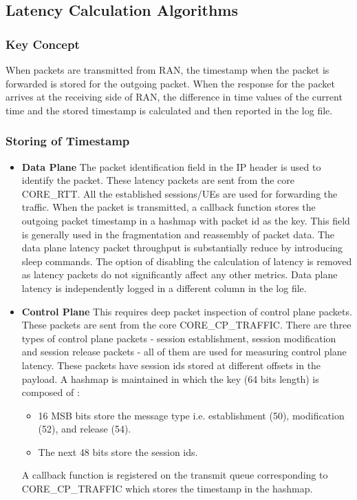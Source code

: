 \documentclass{article}
\begin{document}
\subsection{Latency Calculation Algorithms}
\subsubsection{Key Concept}
When packets are transmitted from RAN, the timestamp when the packet is forwarded is stored for the outgoing packet. When the response for the packet arrives at the receiving side of RAN, the difference in time values of the current time and the stored timestamp  is calculated and then reported in the log file.
\subsubsection{Storing of Timestamp}
\begin{itemize}
    \item \textbf{Data Plane} The packet identification field in the IP header is used to identify the packet. These latency packets
    are sent from the core CORE\_RTT. All the established sessions/UEs are used for forwarding the traffic. When the packet is
    transmitted, a callback  function stores the outgoing packet timestamp in a hashmap with packet id as the key. This field is
    generally used in the fragmentation and reassembly of packet data. The data plane latency packet throughput is substantially reduce by introducing sleep commands. The option of disabling the calculation of latency is removed as latency packets do   not significantly affect any other metrics. Data plane latency is independently logged in a different column in the log file.
    \item \textbf{Control Plane}
    This requires deep packet inspection of control plane packets. These packets are sent from the core CORE\_CP\_TRAFFIC.
    There are three types of control plane packets - session establishment, session modification and session release packets - all of
    them are used for measuring control plane latency. These packets have session ids stored at different offsets in the payload. A
    hashmap is maintained in which the key (64 bits length) is composed of :
    \begin{itemize}
        \item 16 MSB bits store the message type i.e. establishment (50), modification (52), and release (54).
        \item The next 48 bits store the session ids.
    \end{itemize}
A callback function is registered on  the transmit queue corresponding to CORE\_CP\_TRAFFIC which stores the timestamp in the hashmap.
\end{itemize}
\end{document}
